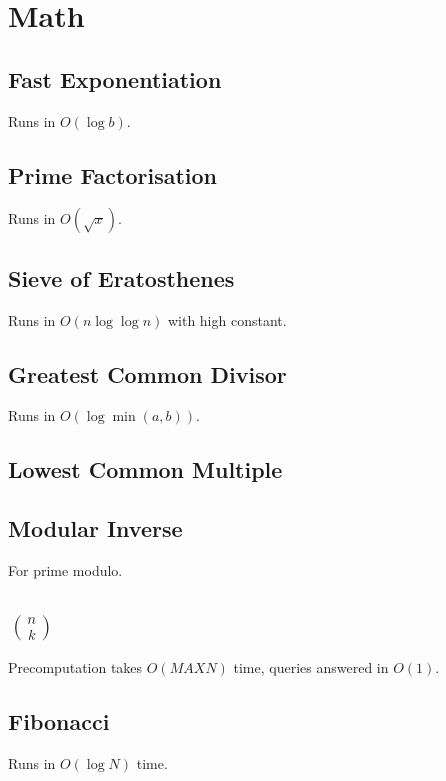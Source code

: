 \documentclass{article}
\begin{document}
\section{Math}
\subsection{Fast Exponentiation}
Runs in $O(\log{b})$.


\subsection{Prime Factorisation}
Runs in $O(\sqrt{x})$.


\subsection{Sieve of Eratosthenes}
Runs in $O(n \log \log n)$ with high constant.


\subsection{Greatest Common Divisor}
Runs in $O(\log \min(a, b))$.


\subsection{Lowest Common Multiple}


\subsection{Modular Inverse}
For prime modulo.


\subsection{$n \choose k$}
Precomputation takes $O(MAXN)$ time, queries answered in $O(1)$.


\subsection{Fibonacci}
Runs in $O(\log N)$ time.

\end{document}
